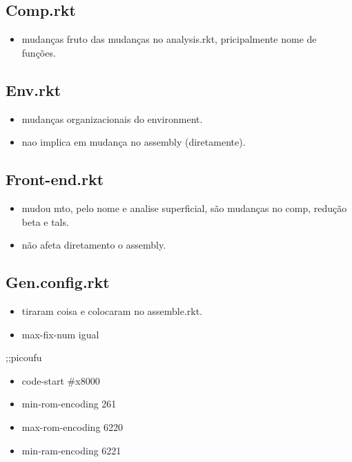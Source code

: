 \documentclass[11pt]{article}
\begin{document}
\subsection{Comp.rkt}
\label{sec-14-7}

\begin{itemize}
\item mudanças fruto das mudanças no analysis.rkt, pricipalmente nome de funções.
\end{itemize}

\subsection{Env.rkt}
\label{sec-14-8}

\begin{itemize}
\item mudanças organizacionais do environment.
\item nao implica em mudança no assembly (diretamente).
\end{itemize}

\subsection{Front-end.rkt}
\label{sec-14-9}

\begin{itemize}
\item mudou mto, pelo nome e analise superficial, são mudanças no comp, redução beta e tals.
\item não afeta diretamento o assembly.
\end{itemize}

\subsection{Gen.config.rkt}
\label{sec-14-10}

\begin{itemize}
\item tiraram coisa e colocaram no assemble.rkt.
\item max-fix-num igual
\end{itemize}

;;picoufu
\begin{itemize}
\item code-start \#x8000
\item min-rom-encoding 261
\item max-rom-encoding 6220
\item min-ram-encoding 6221
\end{itemize}
\end{document}
